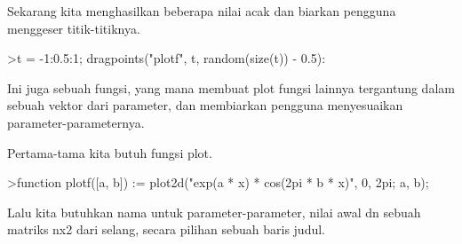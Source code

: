 \documentclass[a4paper,10pt]{article}
\begin{document}
\begin{eulernotebook}
\begin{eulercomment}
\begin{eulercomment}
\begin{eulercomment}
\begin{eulercomment}
\begin{eulercomment}
Sekarang kita menghasilkan beberapa nilai acak dan biarkan pengguna
menggeser titik-titiknya.
\end{eulercomment}
\begin{eulerprompt}
>t = -1:0.5:1; dragpoints("plotf", t, random(size(t)) - 0.5):
\end{eulerprompt}
\begin{eulercomment}
Ini juga sebuah fungsi, yang mana membuat plot fungsi lainnya
tergantung dalam sebuah vektor dari parameter, dan membiarkan pengguna
menyesuaikan parameter-parameternya.

Pertama-tama kita butuh fungsi plot.
\end{eulercomment}
\begin{eulerprompt}
>function plotf([a, b]) := plot2d("exp(a * x) * cos(2pi * b * x)", 0, 2pi; a, b);
\end{eulerprompt}
\begin{eulercomment}
Lalu kita butuhkan nama untuk parameter-parameter, nilai awal dn
sebuah matriks nx2 dari selang, secara pilihan sebuah baris judul.


\end{eulercomment}
\end{eulercomment}
\end{eulercomment}
\end{eulercomment}
\end{eulercomment}
\end{eulernotebook}
\end{document}
